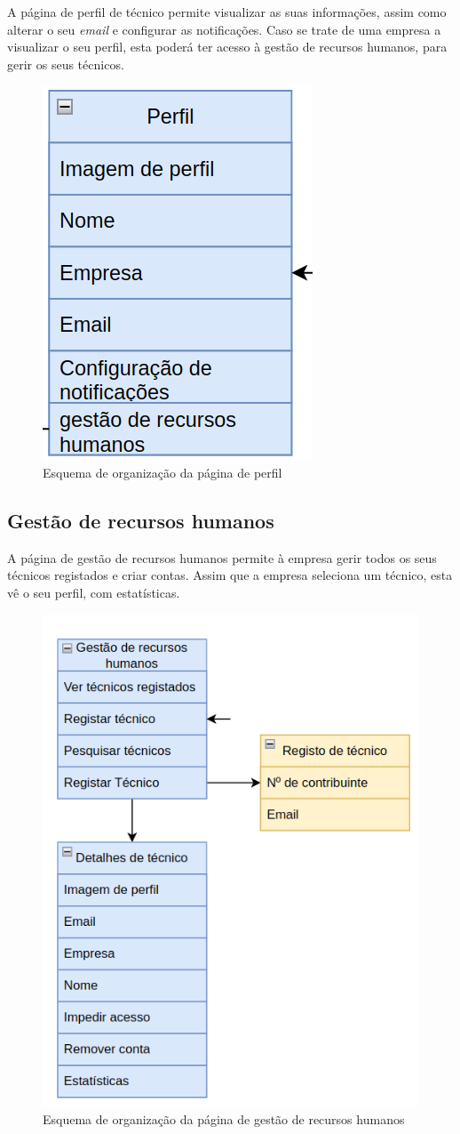 A página de perfil de técnico permite visualizar as suas informações, assim como alterar 
o seu \textit{email} e configurar as notificações. Caso se trate de uma empresa a visualizar o seu perfil, esta poderá ter acesso à gestão de recursos humanos, para gerir os seus técnicos.
\begin{figure}[htb]
  \centering
  
  \includegraphics[height=0.35\textwidth]{images/Arquiteturas/superficial_de_app/perfil.png}
  \caption{Esquema de organização da página de perfil}
  \label{fig:10}
\end{figure}

\newpage

\subsection{Gestão de recursos humanos}

A página de gestão de recursos humanos permite à empresa gerir todos os seus técnicos registados e criar contas. Assim que a empresa seleciona um técnico, esta vê o seu perfil, 
com estatísticas.
\begin{figure}[htb]
  \centering
  
  \includegraphics[height=0.7\textwidth]{images/Arquiteturas/superficial_de_app/gestao_recursos_humanos.png}
  \caption{Esquema de organização da página de gestão de recursos humanos}
  \label{fig:11}
\end{figure}